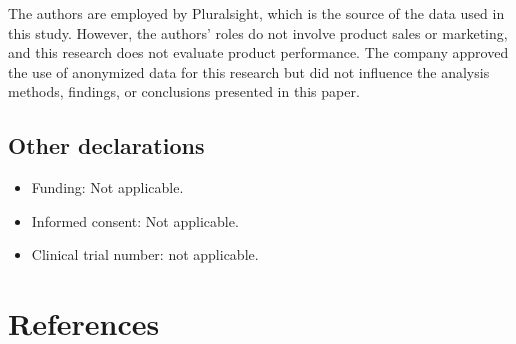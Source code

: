 \documentclass[
]{article}
\providecommand{\tightlist}{%
  \setlength{\itemsep}{0pt}\setlength{\parskip}{0pt}}\usepackage{longtable,booktabs,array}
\begin{document}
The authors are employed by Pluralsight, which is the source of the data
used in this study. However, the authors' roles do not involve product
sales or marketing, and this research does not evaluate product
performance. The company approved the use of anonymized data for this
research but did not influence the analysis methods, findings, or
conclusions presented in this paper.

\subsection{Other declarations}\label{other-declarations}

\begin{itemize}
\tightlist
\item
  Funding: Not applicable.
\item
  Informed consent: Not applicable.
\item
  Clinical trial number: not applicable.
\end{itemize}

\section*{References}\label{references}
\end{document}
